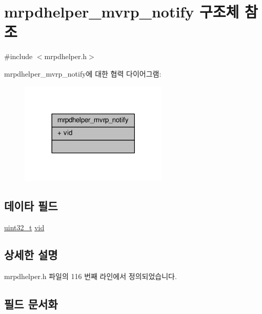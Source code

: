 \hypertarget{structmrpdhelper__mvrp__notify}{}\section{mrpdhelper\+\_\+mvrp\+\_\+notify 구조체 참조}
\label{structmrpdhelper__mvrp__notify}


{\ttfamily \#include $<$mrpdhelper.\+h$>$}



mrpdhelper\+\_\+mvrp\+\_\+notify에 대한 협력 다이어그램\+:
\nopagebreak
\begin{figure}[H]
\begin{center}
\leavevmode
\includegraphics[width=201pt]{structmrpdhelper__mvrp__notify__coll__graph}
\end{center}
\end{figure}
\subsection*{데이타 필드}
\begin{DoxyCompactItemize}
\item 
\hyperlink{parse_8c_a6eb1e68cc391dd753bc8ce896dbb8315}{uint32\+\_\+t} \hyperlink{structmrpdhelper__mvrp__notify_a98780fe4ab562a61abfd7870ea0910c3}{vid}
\end{DoxyCompactItemize}


\subsection{상세한 설명}


mrpdhelper.\+h 파일의 116 번째 라인에서 정의되었습니다.



\subsection{필드 문서화}
